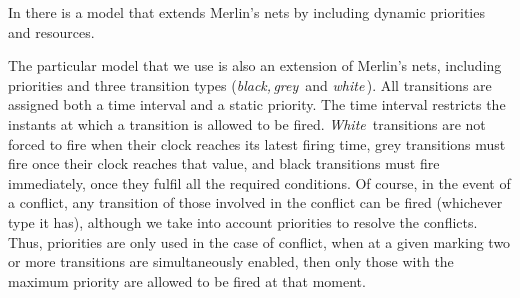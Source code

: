 In \cite{Buc03} there is a model that
extends Merlin's nets by including dynamic priorities and resources.

The particular model that we use is also an extension of Merlin's
nets, 
including priorities and three transition types ({\em black,\,grey\,} and
{\em white\,}). All transitions are assigned both a time interval
and a static priority. The time interval restricts the instants at
which a transition is allowed to be fired. {\em White}\, transitions
are not forced to fire when their clock reaches its latest firing
time, grey transitions must fire once their clock reaches that value, 
and black  transitions
must fire immediately, once they fulfil all the required conditions. 
Of course, in the
event of a conflict, any transition of those involved in the conflict 
can be fired (whichever type it has), although we take into account 
priorities to resolve the conflicts. Thus, priorities are only
used in the case of conflict, when at a given marking two or more
transitions are simultaneously enabled, then only those with 
the maximum priority are allowed to be fired at that moment.
